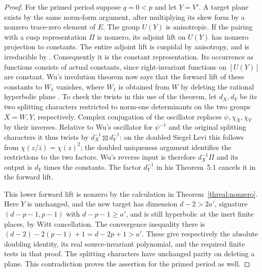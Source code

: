 \begin{proof}
For the primed period suppose \(q=0<p\) and let \(Y=V'\). A target
plane exists by the same norm-form argument, after multiplying its
skew form by a nonzero trace-zero element of \(E\).
The group \(U(Y)\) is anisotropic.
If the pairing with a cusp representation \(\Pi\) is nonzero, its
adjoint lift on \(U(Y)\) has nonzero projection to constants.
The entire adjoint lift is cuspidal by anisotropy, and is irreducible
by \cite[Theorem~5.3]{wuThetaTower}. Consequently it is the constant
representation. Its occurrence as functions consists of actual
constants, since right-invariant functions on \([U(Y)]\) are
constant. Wu's involution theorem now says that the forward lift of
these constants to \(W_1\) vanishes, where \(W_1\) is obtained from
\(W\) by deleting the rational hyperbolic plane
\cite[Theorem~5.1(3), Remark~5.2]{wuThetaTower}.
To check the twists in this use of the theorem, let \(d_X,d_Y\)
be its two splitting characters restricted to norm-one determinants
on the two groups \(X=W,Y\), respectively. Complex conjugation
of the oscillator replaces \(\psi,\chi_X,\chi_Y\) by their
inverses. Relative to Wu's oscillator for \(\psi^{-1}\) and the
original splitting characters it thus twists by
\(d_X^{-1}\boxtimes d_Y^{-1}\): on the doubled Siegel Levi this
follows from \(\chi(z/\bar z)=\chi(z)^2\); the doubled uniqueness
argument identifies the restrictions to the two factors. Wu's
reverse input is therefore \(d_X^{-1}\Pi\) and its output is
\(d_Y\) times the constants. The factor \(d_Y^{-1}\) in his
Theorem~5.1 cancels it in the forward lift.

This lower forward lift is nonzero by the calculation in
Theorem~\ref{threal:nonzero}. Here \(Y\) is unchanged, and the
new target has dimension \(d-2>2a'\), signature
\((d-p-1,p-1)\) with \(d-p-1\ge a'\), and is still hyperbolic
at the inert finite places, by Witt cancellation. The convergence
inequality there is \((d-2)-2(p-1)+1=d-2p+1>a'\).
These give respectively the absolute doubling identity, its real
source-invariant polynomial, and the required finite tests in that
proof. The splitting characters have unchanged parity on deleting
a plane. This contradiction proves the assertion for the primed
period as well.


\end{proof}
